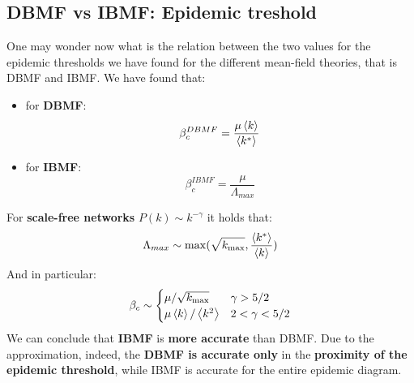 \documentclass[../main/main.tex]{subfiles}
\begin{document}
\subsection{DBMF vs IBMF: Epidemic treshold}
One may wonder now what is the relation between the two values for the epidemic thresholds we have found for the different mean-field theories, that is DBMF and IBMF. We have found that:
\begin{itemize}
\item for \textbf{DBMF}:
\begin{equation*}
  \beta _c^{DBMF} = \frac{\mu \expval{k} }{\expval{k^*} }
\end{equation*}

\item for \textbf{IBMF}:
\begin{equation*}
\beta _c^{IBMF} = \frac{\mu }{\Lambda _{max}}
\end{equation*}
\end{itemize}
For \textbf{scale-free networks} \( P(k) \sim k^{-\gamma  } \) it holds that:
\begin{equation}
  \Lambda _{max} \sim \max(\sqrt{k_{\max}}, \frac{\expval{k^*}}{\expval{k}}   )
\end{equation}
And in particular:
\begin{equation}
\beta _c \sim
  \begin{cases}
   \mu / \sqrt{k_{\max}} & \gamma > 5/2  \\
   \mu \expval{k}/\expval{k^2} & 2 < \gamma < 5/2
  \end{cases}
\end{equation}
We can conclude that \textbf{IBMF} is \textbf{more accurate} than DBMF. Due to the approximation, indeed, the \textbf{DBMF is accurate only} in the \textbf{proximity of the epidemic threshold}, while IBMF is accurate for the entire epidemic diagram.
\end{document}

